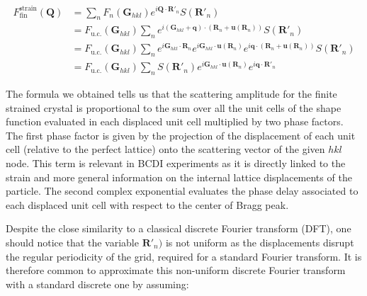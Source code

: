 \begin{equation}
    \begin{aligned}
        F^{\text{strain}}_{\text{fin}}(\mathbf{Q}) &= 
        \sum_{n} F_n(\mathbf{G}_{hkl}) e^{i \mathbf{Q} \cdot \mathbf{R}'_n} S(\mathbf{R}'_n) \\
        &= F_{\text{u.c.}}(\mathbf{G}_{hkl}) \sum_{n}  e^{i (\mathbf{G}_{hkl} + \mathbf{q}) \cdot  (\mathbf{R}_n + \mathbf{u}(\mathbf{R}_n)) } S(\mathbf{R}'_n) \\
        &= F_{\text{u.c.}}(\mathbf{G}_{hkl}) \sum_{n}  e^{i \mathbf{G}_{hkl}\cdot  \mathbf{R}_n} e^{i \mathbf{G}_{hkl} \cdot  \mathbf{u}(\mathbf{R}_n) } e^{i \mathbf{q} \cdot  (\mathbf{R}_n + \mathbf{u}(\mathbf{R}_n)) } S(\mathbf{R}'_n) \\
        &= F_{\text{u.c.}}(\mathbf{G}_{hkl}) \sum_{n} S(\mathbf{R}'_n) e^{i \mathbf{G}_{hkl} \cdot  \mathbf{u}(\mathbf{R}_n) } e^{i \mathbf{q} \cdot  \mathbf{R}'_n }
    \end{aligned}
    \label{eq:strain_fin4}
\end{equation}

The formula we obtained tells us that the scattering amplitude for the finite strained crystal is proportional to the 
sum over all the unit cells of the shape function evaluated in each displaced unit cell multiplied by two phase factors. 
The first phase factor is given by the projection of the displacement of each unit cell (relative to the perfect lattice) 
onto the scattering vector of the given $hkl$ node. This term is relevant in BCDI experiments as it is directly linked to 
the strain and more general information on the internal lattice displacements of the particle. 
The second complex exponential evaluates the phase delay associated to each displaced unit cell with respect to the 
center of Bragg peak. 

Despite the close similarity to a classical discrete Fourier transform (DFT), one should notice that the variable $\mathbf{R}'_n)$ 
is not uniform as the displacements disrupt the regular periodicity of the grid, required for a standard Fourier transform. 
It is therefore common to approximate this non-uniform discrete Fourier transform with a standard discrete one by assuming: 

